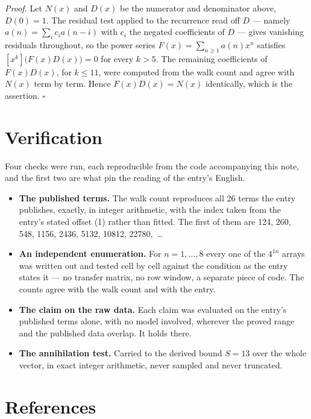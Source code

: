 \documentclass[11pt]{article}
\theoremstyle{definition}
\begin{document}
{\itshape Proof.} Let $N(x)$ and $D(x)$ be the numerator and denominator above, $D(0)=1$. The residual test applied to the recurrence read off $D$ --- namely $a(n) = \sum_i c_i a(n-i)$ with $c_i$ the negated coefficients of $D$ --- gives vanishing residuals throughout, so the power series $F(x)=\sum_{n\ge 1}a(n)x^n$ satisfies $[x^k]\bigl(F(x)D(x)\bigr) = 0$ for every $k > 5$. The remaining coefficients of $F(x)D(x)$, for $k \le 11$, were computed from the walk count and agree with $N(x)$ term by term. Hence $F(x)D(x) = N(x)$ identically, which is the assertion. $\square$

\section{Verification}

Four checks were run, each reproducible from the code accompanying this note, and the first two are what pin the reading of the entry's English.

\begin{itemize}

\item {\bfseries The published terms.} The walk count reproduces all 26 terms the entry publishes, exactly, in integer arithmetic, with the index taken from the entry's stated offset (1) rather than fitted. The first of them are 124, 260, 548, 1156, 2436, 5132, 10812, 22780,~\dots

\item {\bfseries An independent enumeration.} For $n = 1,\dots,8$ every one of the $4^{1n}$ arrays was written out and tested cell by cell against the condition as the entry states it --- no transfer matrix, no row window, a separate piece of code. The counts agree with the walk count and with the entry.

\item {\bfseries The claim on the raw data.} Each claim was evaluated on the entry's published terms alone, with no model involved, wherever the proved range and the published data overlap. It holds there.

\item {\bfseries The annihilation test.} Carried to the derived bound $S = 13$ over the whole vector, in exact integer arithmetic, never sampled and never truncated.

\end{itemize}

\section{References}
\end{document}
